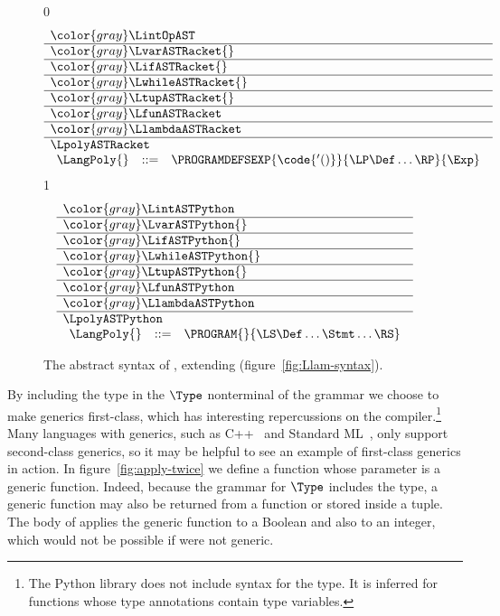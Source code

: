 \documentclass[7x10]{TimesAPriori_MIT}%
\newcommand{\gray}[1]{{\color{gray} #1}}
\def\racketEd{0}
\def\pythonEd{1}
\def\edition{0}
\numberwithin{theorem}{chapter}
\numberwithin{definition}{chapter}
\numberwithin{equation}{chapter}
\begin{document}
\begin{figure}[tp]
\centering
\begin{tcolorbox}[colback=white]
\footnotesize
\if\edition\racketEd
\[
\begin{array}{l}
  \gray{\LintOpAST} \\ \hline
  \gray{\LvarASTRacket{}} \\ \hline
  \gray{\LifASTRacket{}} \\ \hline
  \gray{\LwhileASTRacket{}} \\ \hline
  \gray{\LtupASTRacket{}} \\ \hline
  \gray{\LfunASTRacket} \\ \hline
  \gray{\LlambdaASTRacket} \\ \hline
  \LpolyASTRacket \\
\begin{array}{lcl}
  \LangPoly{} &::=& \PROGRAMDEFSEXP{\code{'()}}{\LP\Def\ldots\RP}{\Exp}
\end{array}
\end{array}
\]
\fi
\if\edition\pythonEd
\[
\begin{array}{l}
  \gray{\LintASTPython} \\ \hline
  \gray{\LvarASTPython{}} \\ \hline
  \gray{\LifASTPython{}} \\ \hline
  \gray{\LwhileASTPython{}} \\ \hline
  \gray{\LtupASTPython{}} \\ \hline
  \gray{\LfunASTPython} \\ \hline
  \gray{\LlambdaASTPython} \\ \hline
  \LpolyASTPython \\
  \begin{array}{lcl}
  \LangPoly{} &::=& \PROGRAM{}{\LS \Def \ldots \Stmt \ldots \RS}
  \end{array}
\end{array}
\]
\fi
\end{tcolorbox}

\caption{The abstract syntax of \LangPoly{}, extending \LangLam{}
    (figure~\ref{fig:Llam-syntax}).}
\label{fig:Lpoly-syntax}
\end{figure}

By including the  type in the $\Type$ nonterminal of the
grammar we choose to make generics first-class, which has interesting
repercussions on the compiler.\footnote{The Python  library does
not include syntax for the  type. It is inferred for functions whose
type annotations contain type variables.}  Many languages with generics, such as
C++~\citep{stroustrup88:_param_types} and Standard
ML~\citep{Milner:1990fk}, only support second-class generics, so it
may be helpful to see an example of first-class generics in action. In
figure~\ref{fig:apply-twice} we define a function 
whose parameter is a generic function. Indeed, because the grammar for
$\Type$ includes the  type, a generic function may also be
returned from a function or stored inside a tuple. The body of
 applies the generic function  to a Boolean
and also to an integer, which would not be possible if  were
not generic.
\end{document}
